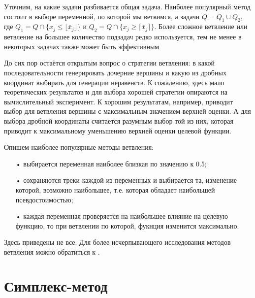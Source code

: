 \documentclass[a4paper,14pt,russian]{extreport}
\begin{document}
\par Уточним, на какие задачи разбивается общая задача. Наиболее популярный метод состоит в выборе переменной, по которой мы ветвимся, а задачи $Q = Q_1 \cup Q_2$, где $Q_1 = Q \cap \{x_j \le \lfloor \bar x_j \rfloor \}$ и $Q_2 = Q \cap \{x_j \ge \lceil \bar x_j \rceil \}$. Более сложное ветвление или ветвление на большее количество подзадач редко используется, тем не менее в некоторых задачах также может быть эффективным \cite{borndoerfer} \cite{clochard} \cite{naddef}
\par До сих пор остаётся открытым вопрос о стратегии ветвления: в какой последовательности генерировать дочерние вершины и какую из дробных координат выбирать для генерации неравенств. К сожалению, здесь мало теоретических результатов и для выбора хорошей стратегии опираются на вычислительный эксперимент. К хорошим результатам, например, приводит выбор для ветвления вершины с максимальным значением верхней оценки. А для выбора дробной координаты считается разумным выбор той из них, которая приводит к максимальному уменьшению верхней оценки целевой функции. 
\par Опишем наиболее популярные методы ветвления:
  \begin{itemize}
  \item[•] выбирается переменная наиболее близкая по значению к 0.5;
  \item[•] сохраняются треки каждой из переменных и выбирается та, изменение которой, возможно наибольшее, т.е. которая обладает наибольшей псевдостоимостью;
  \item[•] каждая переменная проверяется на наибольшее влияние на целевую функцию, то при ветвлении по которой, фукнция изменится максимально.
  \end{itemize}
\par Здесь приведены не все. Для более исчерпывающего исследования методов ветвления можно обратиться к \cite{land_powell} \cite{linderoth} \cite{fuegenschuh}.


\section{Симплекс-метод}
\end{document}
